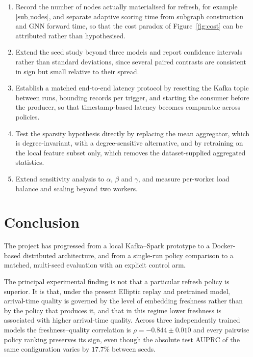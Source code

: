 \documentclass[conference]{IEEEtran}
\begin{document}
\begin{enumerate}
\item Record the number of nodes actually materialised for refresh, for example
      $|\mathrm{sub\_nodes}|$, and separate adaptive scoring time from subgraph
      construction and GNN forward time, so that the cost paradox of
      Figure~\ref{fig:cost} can be attributed rather than hypothesised.
\item Extend the seed study beyond three models and report confidence intervals
      rather than standard deviations, since several paired contrasts are
      consistent in sign but small relative to their spread.
\item Establish a matched end-to-end latency protocol by resetting the Kafka
      topic between runs, bounding records per trigger, and starting the
      consumer before the producer, so that timestamp-based latency becomes
      comparable across policies.
\item Test the sparsity hypothesis directly by replacing the mean aggregator,
      which is degree-invariant, with a degree-sensitive alternative, and by
      retraining on the local feature subset only, which removes the
      dataset-supplied aggregated statistics.
\item Extend sensitivity analysis to $\alpha$, $\beta$ and $\gamma$, and
      measure per-worker load balance and scaling beyond two workers.
\end{enumerate}

\section{Conclusion}

The project has progressed from a local Kafka--Spark prototype to a
Docker-based distributed architecture, and from a single-run policy comparison
to a matched, multi-seed evaluation with an explicit control arm.

The principal experimental finding is not that a particular refresh policy is
superior. It is that, under the present Elliptic replay and pretrained model,
arrival-time quality is governed by the level of embedding freshness rather
than by the policy that produces it, and that in this regime lower freshness is
associated with higher arrival-time quality. Across three independently trained
models the freshness--quality correlation is $\rho = -0.844 \pm 0.010$ and
every pairwise policy ranking preserves its sign, even though the absolute test
AUPRC of the same configuration varies by $17.7\%$ between seeds.
\end{document}
